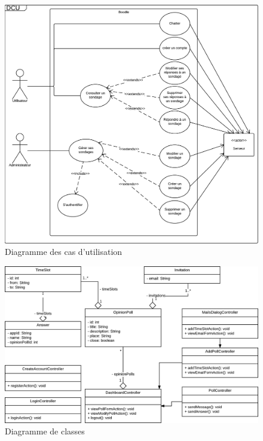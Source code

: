 \documentclass[titlepage]{report}
\begin{document}
\begin{figure}[h]
	\caption{Diagramme des cas d'utilisation}
	\label{annexe_diagramme_casDUtilisation}
	\centering
	\includegraphics[width=\textwidth]{figures/diagrammes/casDUtilisation.png}
\end{figure}

\begin{figure}[h]
	\caption{Diagramme de classes}
	\label{annexe_diagramme_classes}
	\centering
	\includegraphics[width=\textwidth]{figures/diagrammes/classes.png}
\end{figure}
\end{document}
